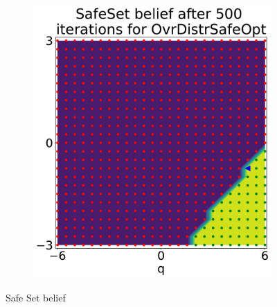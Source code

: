 \begin{figure}[h!]
\begin{subfigure}{0.32\textwidth}
		\caption{}
		\label{fig:dbo-safeset}
	\end{subfigure}
	\hspace*{1.8em}
	\begin{subfigure}{0.32\textwidth}
		\includegraphics[scale=0.25]{figures/results/robot-ovr-safeset-500.pdf}
		\caption{}
		\label{fig:ovr-safeset}
	\end{subfigure}
	\caption{Safe Set belief}
	\label{fig:safeset-result}
\end{figure}